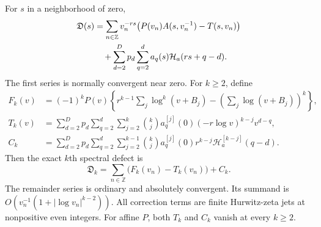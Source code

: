 \begin{theorem}
\label{msj:thm:alljets}
For $s$ in a neighborhood of zero,
\begin{align}
 \mathfrak D(s)
 &=\sum_{n\in\mathbb Z}v_n^{-rs}
             \bigl(P(v_n)A(s,v_n^{-1})-T(s,v_n)\bigr)
 \notag\\
 &\quad+\sum_{d=2}^{D}p_d\sum_{q=2}^{d}
                           a_q(s)\mathcal H_a(rs+q-d).
 \label{msj:eq:regulator}
\end{align}
The first series is normally convergent near zero. For $k\ge2$, define
\begin{align}
 F_k(v)&=(-1)^kP(v)\left\{
     r^{k-1}\sum_j\log^k(v+B_j)
            -\left(\sum_j\log(v+B_j)\right)^k\right\},
 \label{msj:eq:raw-k}\\
 T_k(v)&=\sum_{d=2}^{D}p_d\sum_{q=2}^{d}
       \sum_{j=2}^{k}\binom{k}{j}a_q^{[j]}(0)
                (-r\log v)^{k-j}v^{d-q},
 \label{msj:eq:Tk}\\
 C_k&=\sum_{d=2}^{D}p_d\sum_{q=2}^{d}
       \sum_{j=2}^{k-1}\binom{k}{j}a_q^{[j]}(0)
                 r^{k-j}\mathcal H_a^{[k-j]}(q-d).
 \label{msj:eq:Ck}
\end{align}
Then the exact $k$th spectral defect is
\begin{equation}
 \boxed{\displaystyle
 \mathfrak D_k=\sum_{n\in\mathbb Z}\bigl(F_k(v_n)-T_k(v_n)\bigr)+C_k.}
 \label{msj:eq:alljets}
\end{equation}
The remainder series is ordinary and absolutely convergent. Its
summand is $O(v_n^{-1}(1+|\log v_n|^{k-2}))$. All correction terms are
finite Hurwitz-zeta jets at nonpositive even integers. For affine $P$,
both $T_k$ and $C_k$ vanish at every $k\ge2$.
\end{theorem}

